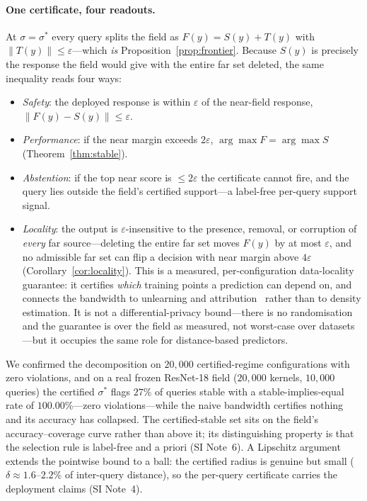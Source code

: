 \documentclass[10pt,twocolumn]{article}
\newcommand{\sstar}{\sigma^{*}}
\begin{document}
\paragraph{One certificate, four readouts.} At $\sigma=\sstar$ every query splits the field as $F(y)=S(y)+T(y)$ with $\lVert T(y)\rVert\le\varepsilon$---which \emph{is} Proposition~\ref{prop:frontier}. Because $S(y)$ is precisely the response the field would give with the entire far set deleted, the same inequality reads four ways:
\begin{itemize}
\item \emph{Safety}: the deployed response is within $\varepsilon$ of the near-field response, $\lVert F(y)-S(y)\rVert\le\varepsilon$.
\item \emph{Performance}: if the near margin exceeds $2\varepsilon$, $\arg\max F=\arg\max S$ (Theorem~\ref{thm:stable}).
\item \emph{Abstention}: if the top near score is $\le2\varepsilon$ the certificate cannot fire, and the query lies outside the field's certified support---a label-free per-query support signal.
\item \emph{Locality}: the output is $\varepsilon$-insensitive to the presence, removal, or corruption of \emph{every} far source---deleting the entire far set moves $F(y)$ by at most $\varepsilon$, and no admissible far set can flip a decision with near margin above $4\varepsilon$ (Corollary~\ref{cor:locality}). This is a measured, per-configuration data-locality guarantee: it certifies \emph{which} training points a prediction can depend on, and connects the bandwidth to unlearning and attribution~\cite{ginart2019,koh2017} rather than to density estimation. It is not a differential-privacy bound---there is no randomisation and the guarantee is over the field as measured, not worst-case over datasets---but it occupies the same role for distance-based predictors.
\end{itemize}
We confirmed the decomposition on $20{,}000$ certified-regime configurations with zero violations, and on a real frozen ResNet-18 field ($20{,}000$ kernels, $10{,}000$ queries) the certified $\sstar$ flags $27\%$ of queries stable with a stable-implies-equal rate of $100.00\%$---zero violations---while the naive bandwidth certifies nothing and its accuracy has collapsed. The certified-stable set sits on the field's accuracy--coverage curve rather than above it; its distinguishing property is that the selection rule is label-free and a priori (SI Note~6). A Lipschitz argument extends the pointwise bound to a ball: the certified radius is genuine but small ($\delta\approx1.6$--$2.2\%$ of inter-query distance), so the per-query certificate carries the deployment claims (SI Note~4).
\end{document}
